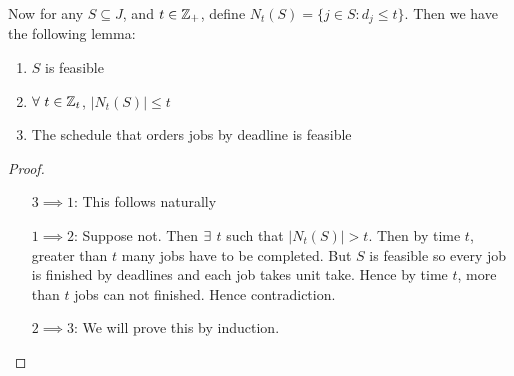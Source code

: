 Now  for any $S\subseteq J$, and $t\in\mathbb{Z}_+$, define $N_t(S)=\{j\in S\colon d_j\leq t\}$. Then we have the following lemma:
\begin{lemma}{}{}
	\Tfae
	\begin{enumerate}[label=\bfseries\tiny\protect\circled{\small\arabic*}]
		\item $S$ is feasible
		\item $\forall\ t\in\mathbb{Z}_t$, $|N_t(S)|\leq t$
		\item The schedule that orders jobs by deadline is feasible
	\end{enumerate}
\end{lemma}
\begin{proof}
\begin{itemize}[leftmargin=2cm]
	\item[$3\implies 1$:] This follows naturally
	\item[$1\implies 2$:] Suppose not. Then $\exists$ $t$ such that $|N_t(S)|>t$. Then by time $t$, greater than $t$ many jobs have to be completed. But  $S$ is feasible so every job is finished by deadlines and each job takes unit take. Hence by time $t$, more than $t$ jobs can not finished. Hence contradiction.
	\item[$2\implies 3$:] We will prove this by induction.
\end{itemize}
\end{proof}


